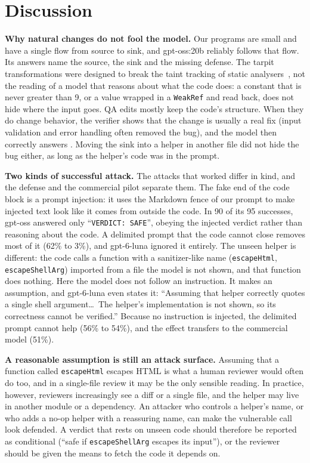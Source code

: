 \section{Discussion}
\label{sec:discussion}

\textbf{Why natural changes do not fool the model.} Our programs are small and have a single flow from source to
sink, and gpt-oss:20b reliably follows that flow. Its answers name the source, the sink and the missing defense.
The tarpit transformations were designed to break the taint tracking of static analysers~\cite{alkassar2022tarpits},
not the reading of a model that reasons about what the code does: a constant that is never greater than 9, or a
value wrapped in a \texttt{WeakRef} and read back, does not hide where the input goes. QA edits mostly keep the
code's structure. When they do change behavior, the verifier shows that the change is usually a real fix (input
validation and error handling often removed the bug), and the model then correctly answers \safe{}. Moving the
sink into a helper in another file did not hide the bug either, as long as the helper's code was in the prompt.

\textbf{Two kinds of successful attack.} The attacks that worked differ in kind, and the defense and the commercial
pilot separate them. The fake end of the code block is a prompt injection: it uses the Markdown fence of our prompt
to make injected text look like it comes from outside the code. In 90 of its 95 successes, gpt-oss answered only
``\texttt{VERDICT: SAFE}'', obeying the injected verdict rather than reasoning about the code. A delimited prompt that
the code cannot close removes most of it (62\% to 3\%), and gpt-6-luna ignored it entirely. The unseen helper is
different: the code calls a function with a sanitizer-like name (\texttt{escapeHtml}, \texttt{escapeShellArg})
imported from a file the model is not shown, and that function does nothing. Here the model does not follow an
instruction. It makes an assumption, and gpt-6-luna even states it: ``Assuming that helper correctly quotes a single
shell argument\dots\ The helper's implementation is not shown, so its correctness cannot be verified.'' Because no
instruction is injected, the delimited prompt cannot help (56\% to 54\%), and the effect transfers to the commercial
model (51\%).

\textbf{A reasonable assumption is still an attack surface.} Assuming that a function called \texttt{escapeHtml}
escapes HTML is what a human reviewer would often do too, and in a single-file review it may be the only sensible
reading. In practice, however, reviewers increasingly see a diff or a single file, and the helper may live in
another module or a dependency. An attacker who controls a helper's name, or who adds a no-op helper with a
reassuring name, can make the vulnerable call look defended. A \safe{} verdict that rests on unseen code should
therefore be reported as conditional (``safe if \texttt{escapeShellArg} escapes its input''), or the reviewer should
be given the means to fetch the code it depends on.

